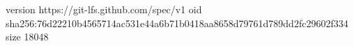 version https://git-lfs.github.com/spec/v1
oid sha256:76d22210b4565714ac531e44a6b71b0418aa8658d79761d789dd2fc29602f334
size 18048
